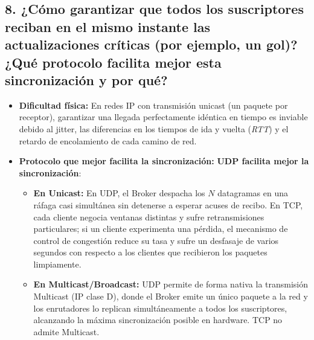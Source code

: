 \documentclass[11pt,a4paper]{article}
\begin{document}
\subsection{8. ¿Cómo garantizar que todos los suscriptores reciban en el mismo instante las actualizaciones críticas (por ejemplo, un gol)? ¿Qué protocolo facilita mejor esta sincronización y por qué?}
\begin{itemize}
    \item \textbf{Dificultad física:} En redes IP con transmisión unicast (un paquete por receptor), garantizar una llegada perfectamente idéntica en tiempo es inviable debido al jitter, las diferencias en los tiempos de ida y vuelta (\textit{RTT}) y el retardo de encolamiento de cada camino de red.
    \item \textbf{Protocolo que mejor facilita la sincronización:} \textbf{UDP facilita mejor la sincronización}:
    \begin{itemize}
        \item \textbf{En Unicast:} En UDP, el Broker despacha los $N$ datagramas en una ráfaga casi simultánea sin detenerse a esperar acuses de recibo. En TCP, cada cliente negocia ventanas distintas y sufre retransmisiones particulares; si un cliente experimenta una pérdida, el mecanismo de control de congestión reduce su tasa y sufre un desfasaje de varios segundos con respecto a los clientes que recibieron los paquetes limpiamente.
        \item \textbf{En Multicast/Broadcast:} UDP permite de forma nativa la transmisión Multicast (IP clase D), donde el Broker emite un único paquete a la red y los enrutadores lo replican simultáneamente a todos los suscriptores, alcanzando la máxima sincronización posible en hardware. TCP no admite Multicast.
    \end{itemize}
\end{itemize}
\end{document}
